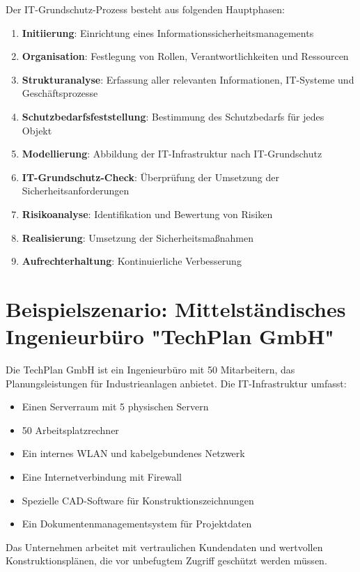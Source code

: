 \documentclass{orgstandard}
\begin{document}
Der IT-Grundschutz-Prozess besteht aus folgenden Hauptphasen:
\begin{enumerate}
\item \textbf{Initiierung}: Einrichtung eines Informationssicherheitsmanagements
\item \textbf{Organisation}: Festlegung von Rollen, Verantwortlichkeiten und Ressourcen
\item \textbf{Strukturanalyse}: Erfassung aller relevanten Informationen, IT-Systeme und Geschäftsprozesse
\item \textbf{Schutzbedarfsfeststellung}: Bestimmung des Schutzbedarfs für jedes Objekt
\end{enumerate}
\begin{enumerate}
\setcounter{enumi}{4}
\item \textbf{Modellierung}: Abbildung der IT-Infrastruktur nach IT-Grundschutz
\item \textbf{IT-Grundschutz-Check}: Überprüfung der Umsetzung der Sicherheitsanforderungen
\item \textbf{Risikoanalyse}: Identifikation und Bewertung von Risiken
\item \textbf{Realisierung}: Umsetzung der Sicherheitsmaßnahmen
\item \textbf{Aufrechterhaltung}: Kontinuierliche Verbesserung
\end{enumerate}
\section{Beispielszenario: Mittelständisches Ingenieurbüro "TechPlan GmbH"}
\label{sec:orgab5ad95}


Die TechPlan GmbH ist ein Ingenieurbüro mit 50 Mitarbeitern, das Planungsleistungen für Industrieanlagen anbietet. Die IT-Infrastruktur umfasst:
\begin{itemize}
\item Einen Serverraum mit 5 physischen Servern
\item 50 Arbeitsplatzrechner
\item Ein internes WLAN und kabelgebundenes Netzwerk
\item Eine Internetverbindung mit Firewall
\item Spezielle CAD-Software für Konstruktionszeichnungen
\item Ein Dokumentenmanagementsystem für Projektdaten
\end{itemize}

Das Unternehmen arbeitet mit vertraulichen Kundendaten und wertvollen Konstruktionsplänen, die vor unbefugtem Zugriff geschützt werden müssen.
\end{document}
